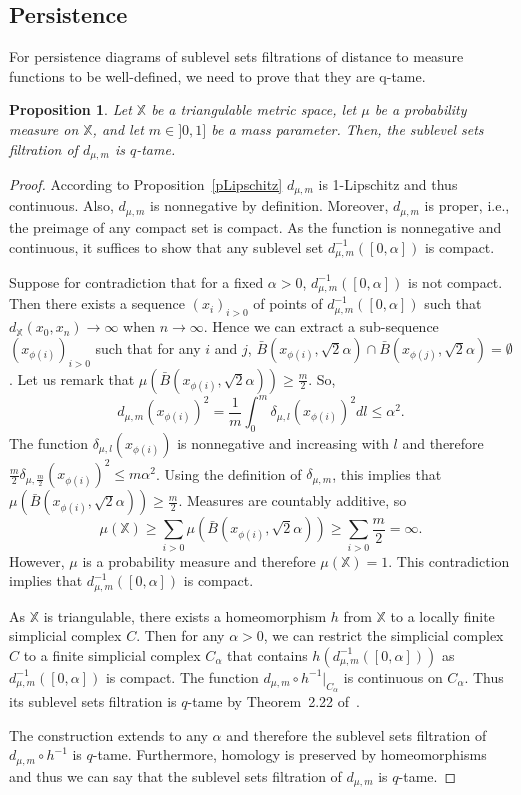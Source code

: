 \documentclass[a4paper]{article}
\newcommand\dm{d_{\mu,m}}
\newcommand\X{\mathbb{X}}
\newcommand\dX[2]{d_\X(#1,#2)}
\newtheorem{proposition}[theorem]{Proposition}
\begin{document}
\subsection{Persistence}
For persistence diagrams of sublevel sets filtrations of distance to measure functions to be well-defined, we need to prove that they are q-tame.
\begin{proposition}\label{pQtame}
Let $\X$ be a triangulable metric space, let $\mu$ be a probability measure on $\X$, and let $m\in]0,1]$ be a mass parameter. 
Then, the sublevel sets filtration of $\dm$ is $q$-tame.
\end{proposition}



\begin{proof}According to Proposition~\ref{pLipschitz} $\dm$ is 1-Lipschitz and thus continuous. 
Also, $\dm$ is nonnegative by definition.
Moreover, $\dm$ is proper, i.e., the preimage of any compact set is compact. 
As the function is nonnegative and continuous, it suffices to show that any sublevel set $\dm^{-1}([0,\alpha])$ is compact.

Suppose for contradiction that for a fixed $\alpha>0$, $\dm^{-1}([0,\alpha])$ is not compact.
Then there exists a sequence $(x_i)_{i>0}$ of points of $\dm^{-1}([0,\alpha])$ such that $\dX{x_0}{x_n}\rightarrow\infty$ when $n\rightarrow\infty$.
Hence we can extract a sub-sequence $(x_{\phi(i)})_{i>0}$ such that for any $i$ and $j$, $\bar{B}(x_{\phi(i)},\sqrt{2}\alpha)\cap \bar{B}(x_{\phi(j)},\sqrt{2}\alpha)=\emptyset$.
Let us remark that $\mu(\bar{B}(x_{\phi(i)},\sqrt{2}\alpha))\geq\frac{m}{2}$.
So,
\[
  \dm(x_{\phi(i)})^2=\frac{1}{m}\int_0^m\delta_{\mu,l}(x_{\phi(i)})^2 dl\leq\alpha^2.
\]
The function $\delta_{\mu,l}(x_{\phi(i)})$ is nonnegative and increasing with $l$ and therefore $\frac{m}{2}\delta_{\mu,\frac{m}{2}}(x_{\phi(i)})^2\leq m\alpha^2$.
Using the definition of $\delta_{\mu,m}$, this implies that $\mu(\bar{B}(x_{\phi(i)},\sqrt{2}\alpha))\geq\frac{m}{2}$.
Measures are countably additive, so 
\[
  \mu(\X)\geq\sum_{i>0}\mu(\bar{B}(x_{\phi(i)},\sqrt{2}\alpha))\geq\sum_{i>0}\frac{m}{2}=\infty.
\]
However, $\mu$ is a probability measure and therefore $\mu(\X)=1$.
This contradiction implies that $\dm^{-1}([0,\alpha])$ is compact.

As $\X$ is triangulable, there exists a homeomorphism $h$ from $\X$ to a locally finite simplicial complex $C$.
Then for any $\alpha>0$, we can restrict the simplicial complex $C$ to a finite simplicial complex $C_\alpha$ that contains $h(\dm^{-1}([0,\alpha]))$ as $\dm^{-1}([0,\alpha])$ is compact.
The function $\dm\circ h^{-1}|_{C_\alpha}$ is continuous on $C_\alpha$.
Thus its sublevel sets filtration is $q$-tame by Theorem~2.22 of~\cite{sspmCDGO}.

The construction extends to any $\alpha$ and therefore the sublevel sets filtration of $\dm\circ h^{-1}$ is $q$-tame.
Furthermore, homology is preserved by homeomorphisms and thus we can say that the sublevel sets filtration of $\dm$ is $q$-tame.
\end{proof}
\end{document}

